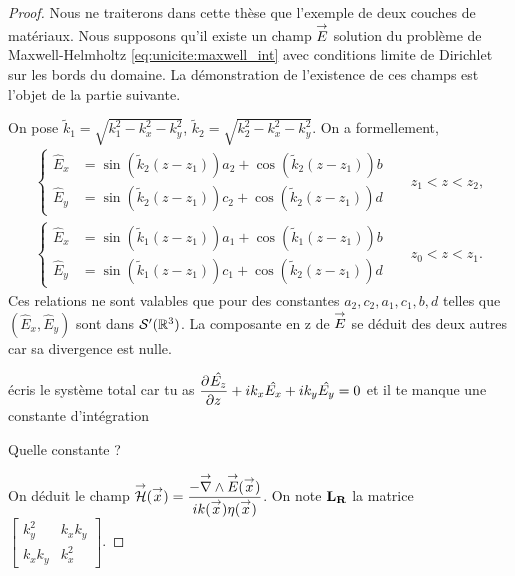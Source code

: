     \begin{proof}
      Nous ne traiterons dans cette thèse que l'exemple de deux couches de matériaux.
      Nous supposons qu'il existe un champ \(\vE\) solution du problème de Maxwell-Helmholtz \eqref{eq:unicite:maxwell_int} avec conditions limite de Dirichlet sur les bords du domaine. La démonstration de l'existence de ces champs est l'objet de la partie suivante.

      \newcommand{\kk}{\tilde{k}}

      On pose \(\kk_1 = \sqrt{k_1^2 - k_x^2 - k_y^2}\),  \(\kk_2 = \sqrt{k_2^2 - k_x^2 - k_y^2}\). On a formellement,
      \begin{align*}
        \left\lbrace
        \begin{aligned}
          \hat{E}_x &= \sin(\kk_2(z-z_1))a_2 +  \cos(\kk_2(z-z_1))b
          \\
          \hat{E}_y &= \sin(\kk_2(z-z_1))c_2 +  \cos(\kk_2(z-z_1))d
        \end{aligned}
        \right. && z_1 < z < z_2,
        \\
        \left\lbrace
        \begin{aligned}
          \hat{E}_x &= \sin(\kk_1(z-z_1))a_1 +  \cos(\kk_1(z-z_1))b
          \\
          \hat{E}_y &= \sin(\kk_1(z-z_1))c_1 +  \cos(\kk_2(z-z_1))d
        \end{aligned}
        \right. && z_0 < z < z_1.
      \end{align*}
      Ces relations ne sont valables que pour des constantes \(a_2,c_2,a_1,c_1,b,d\) telles que \((\hat{E}_x,\hat{E}_y)\) sont dans \(\mathcal{S}'(\RR^3)\).
      La composante en z de \(\vE\) se déduit des deux autres car sa divergence est nulle.

      \begin{REM}
        écris le système total car tu as \(\ddr{z}{\hat{E_z}} + ik_x \hat{E_x} + ik_y\hat{E_y} = 0\) et il te manque une constante d'intégration
      \end{REM}
      \begin{REP}
        Quelle constante ?
      \end{REP}

      On déduit le champ \(\vH(\vx) = \frac{-\vrot{\vE}(\vx)}{i k(\vx)\eta(\vx)}\). On note \(\mLR\) la matrice \(
      \begin{bmatrix}
          k_y^2 & k_xk_y
          \\
          k_xk_y & k_x^2
      \end{bmatrix}
      \).



\end{proof}
